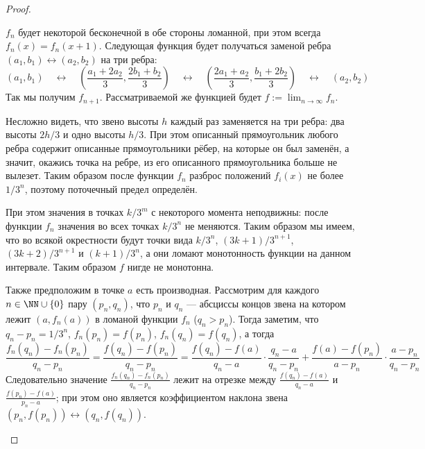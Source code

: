 \documentclass[12pt,a4paper]{article}
\begin{document}
\begin{proof}
\begin{enumerate}
                $f_n$ будет некоторой бесконечной в обе стороны ломанной, при этом всегда $f_n(x) = f_n(x + 1)$. Следующая функция будет получаться заменой ребра $(a_1, b_1) \leftrightarrow (a_2, b_2)$ на три ребра:
                \[
                    (a_1, b_1)
                    \quad \longleftrightarrow \quad
                    \left(\frac{a_1 + 2a_2}{3}, \frac{2b_1 + b_2}{3}\right)
                    \quad \longleftrightarrow \quad
                    \left(\frac{2a_1 + a_2}{3}, \frac{b_1 + 2b_2}{3}\right)
                    \quad \longleftrightarrow \quad
                    (a_2, b_2)
                \]
                Так мы получим $f_{n+1}$. Рассматриваемой же функцией будет $f := \lim_{n \to \infty} f_n$.

                Несложно видеть, что звено высоты $h$ каждый раз заменяется на три ребра: два высоты $2h/3$ и одно высоты $h/3$. При этом описанный прямоугольник любого ребра содержит описанные прямоугольники рёбер, на которые он был заменён, а значит, окажись точка на ребре, из его описанного прямоугольника больше не вылезет. Таким образом после функции $f_n$ разброс положений $f_i(x)$ не более $1/3^n$, поэтому поточечный предел определён.
                
                При этом значения в точках $k/3^m$ с некоторого момента неподвижны: после функции $f_n$ значения во всех точках $k/3^n$ не меняются. Таким образом мы имеем, что во всякой окрестности будут точки вида $k/3^n$, $(3k+1)/3^{n+1}$, $(3k+2)/3^{n+1}$ и $(k+1)/3^n$, а они ломают монотонность функции на данном интервале. Таким образом $f$ нигде не монотонна.

                Также предположим в точке $a$ есть производная. Рассмотрим для каждого $n \in \NN \cup \{0\}$ пару $(p_n, q_n)$, что $p_n$ и $q_n$ --- абсциссы концов звена на котором лежит $(a, f_n(a))$ в ломаной функции $f_n$ ($q_n > p_n$). Тогда заметим, что $q_n-p_n = 1/3^n$, $f_n(p_n) = f(p_n)$, $f_n(q_n) = f(q_n)$, а тогда
                \[
                    \frac{f_n(q_n) - f_n(p_n)}{q_n - p_n}
                    = \frac{f(q_n) - f(p_n)}{q_n - p_n}
                    = \frac{f(q_n) - f(a)}{q_n - a} \cdot \frac{q_n - a}{q_n - p_n} + \frac{f(a) - f(p_n)}{a - p_n} \cdot \frac{a - p_n}{q_n - p_n}
                \]
                Следовательно значение $\frac{f_n(q_n) - f_n(p_n)}{q_n - p_n}$ лежит на отрезке между $\frac{f(q_n) - f(a)}{q_n - a}$ и $\frac{f(p_n) - f(a)}{p_n - a}$; при этом оно является коэффициентом наклона звена $(p_n, f(p_n)) \leftrightarrow (q_n, f(q_n))$.


\end{enumerate}
\end{proof}
\end{document}
